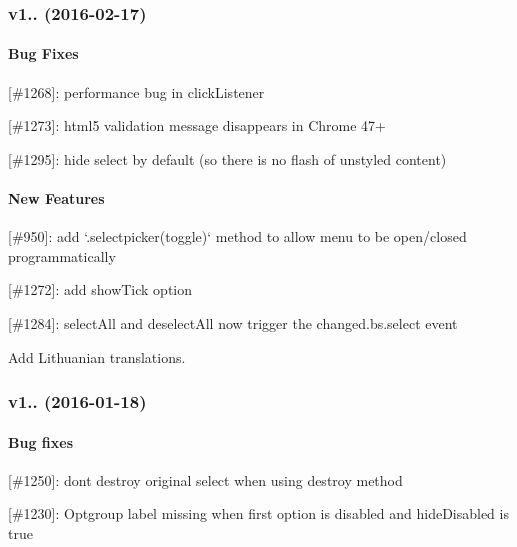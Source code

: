 \subsubsection*{v1.. (2016-\/02-\/17)}

\paragraph*{Bug Fixes}


\begin{DoxyItemize}
\item \mbox{[}\#1268\mbox{]}\+: performance bug in click\+Listener
\item \mbox{[}\#1273\mbox{]}\+: html5 validation message disappears in Chrome 47+
\item \mbox{[}\#1295\mbox{]}\+: hide select by default (so there is no flash of unstyled content)
\end{DoxyItemize}

\paragraph*{New Features}


\begin{DoxyItemize}
\item \mbox{[}\#950\mbox{]}\+: add `.selectpicker(\textquotesingle{}toggle\textquotesingle{})` method to allow menu to be open/closed programmatically
\item \mbox{[}\#1272\mbox{]}\+: add show\+Tick option
\item \mbox{[}\#1284\mbox{]}\+: select\+All and deselect\+All now trigger the {\ttfamily changed.\+bs.\+select} event
\end{DoxyItemize}

Add Lithuanian translations.





\subsubsection*{v1.. (2016-\/01-\/18)}

\paragraph*{Bug fixes}


\begin{DoxyItemize}
\item \mbox{[}\#1250\mbox{]}\+: don\textquotesingle{}t destroy original select when using {\ttfamily destroy} method
\item \mbox{[}\#1230\mbox{]}\+: Optgroup label missing when first option is disabled and {\ttfamily hide\+Disabled} is true
\end{DoxyItemize}


